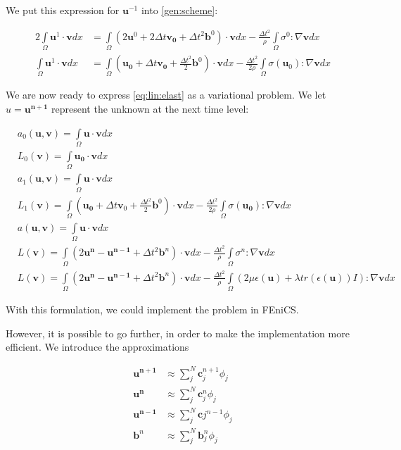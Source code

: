 \documentclass[twoside]{article}
\newcommand{\dtt}{\Delta t^2}
\newcommand{\dt}{\Delta t}
\newcommand{\unp}{\mathbf{u^{n+1}}}
\newcommand{\un}{\mathbf{u^{n}}}
\newcommand{\unm}{\mathbf{u^{n-1}}}
\newcommand{\io}{\int\limits_\Omega}
\newcommand{\sumjn}{\sum^N_j}
\begin{document}
We put this expression for $\mathbf{u}^{-1}$ into \eqref{gen:scheme}:

\begin{align}
2\io \mathbf{u}^{1} \cdot \mathbf{v} dx &= \io (2\mathbf{u}^{0} + 2\dt \mathbf{v_0}  + \dtt \mathbf{b}^0) \cdot \mathbf{v} dx - \frac{\dtt}{\rho} \io \sigma^0 : \nabla \mathbf{v} dx\nonumber\\
\io \mathbf{u}^{1} \cdot \mathbf{v} dx &= \io (\mathbf{u_0} + \dt \mathbf{v_0}  + \frac{\dtt}{2} \mathbf{b}^0) \cdot \mathbf{v} dx - \frac{\dtt}{2\rho} \io \sigma(\mathbf{u}_0) : \nabla \mathbf{v} dx
\label{first:step}
\end{align}

We are now ready to express \eqref{eq:lin:elast} as a variational problem. We let $u=\unp$ represent the unknown at the next time level:
\vspace{0.5cm}
\begin{mdframed}
\begin{align}
&a_0(\mathbf{u},\mathbf{v}) = \io \mathbf{u} \cdot \mathbf{v} dx \label{a:0}\\
&L_0(\mathbf{v}) = \io \mathbf{u_0} \cdot \mathbf{v} dx \\
&a_1(\mathbf{u},\mathbf{v}) = \io \mathbf{u} \cdot \mathbf{v} dx \\
&L_1(\mathbf{v}) = \io (\mathbf{u_0} + \dt \mathbf{v}_0  + \frac{\dtt}{2} \mathbf{b}^0) \cdot \mathbf{v} dx - \frac{\dtt}{2\rho} \io \sigma(\mathbf{u_0}) : \nabla \mathbf{v} dx \\
&a(\mathbf{u},\mathbf{v}) = \io \mathbf{u} \cdot \mathbf{v} dx \\
&L(\mathbf{v}) = \io (2\un - \unm  + \dtt \mathbf{b}^n) \cdot \mathbf{v} dx - \frac{\dtt}{\rho} \io \sigma^n : \nabla \mathbf{v} dx \label{L(v)}\\
&L(\mathbf{v}) =  \io (2\un - \unm  + \dtt \mathbf{b}^n) \cdot \mathbf{v} dx - \frac{\dtt}{\rho} \io (2\mu\epsilon(\mathbf{u}) + \lambda tr(\epsilon(\mathbf{u}))I) : \nabla \mathbf{v} dx
\end{align}
\end{mdframed}

With this formulation, we could implement the problem in FEniCS.

However, it is possible to go further, in order to make the implementation more efficient. We introduce the approximations

\begin{align}
\unp &\approx \sumjn \mathbf{c}_j^{n+1}\phi_j \\
\un &\approx \sumjn \mathbf{c}_j^{n}\phi_j \\
\unm &\approx \sumjn \mathbf{c}j^{n-1}\phi_j \\
\mathbf{b}^n &\approx \sumjn \mathbf{b}_j^{n}\phi_j
\end{align}
\end{document}
